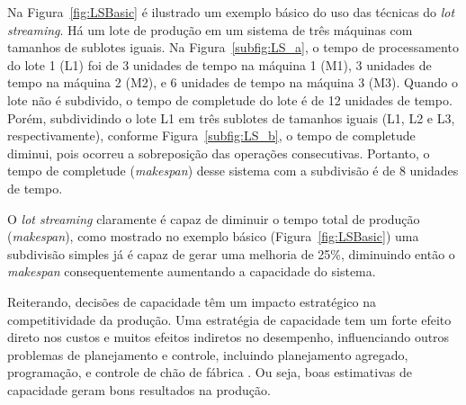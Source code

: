     Na Figura~\ref{fig:LSBasic} é ilustrado um exemplo básico do uso das técnicas do \textit{lot streaming}. Há um lote de produção em um sistema de três máquinas com tamanhos de sublotes iguais. Na Figura~\ref{subfig:LS_a}, o tempo de processamento do lote 1 (L1) foi de 3 unidades de tempo na máquina 1 (M1), 3 unidades de tempo na máquina 2 (M2), e 6 unidades de tempo na máquina 3 (M3). Quando o lote não é subdivido, o tempo de completude do lote é de 12 unidades de tempo. Porém, subdividindo o lote L1 em três sublotes de tamanhos iguais (L1, L2 e L3, respectivamente), conforme Figura~\ref{subfig:LS_b}, o tempo de completude diminui, pois ocorreu a sobreposição das operações consecutivas. Portanto, o tempo de completude (\textit{makespan}) desse sistema com a subdivisão é de 8 unidades de tempo.
    
        
    
    O \textit{lot streaming} claramente é capaz de diminuir o tempo total de produção (\textit{makespan}), como mostrado no exemplo básico (Figura~\ref{fig:LSBasic}) uma subdivisão simples já é capaz de gerar uma melhoria de 25\%, diminuindo então o \textit{makespan} consequentemente aumentando a capacidade do sistema.
    
    Reiterando, decisões de capacidade têm um impacto estratégico na competitividade da produção. Uma estratégia de capacidade tem um forte efeito direto nos custos e muitos efeitos indiretos no desempenho, influenciando outros problemas de planejamento e controle, incluindo planejamento agregado, programação, e controle de chão de fábrica \cite{Hopp2001}. Ou seja, boas estimativas de capacidade geram bons resultados na produção. 
    
    
    
